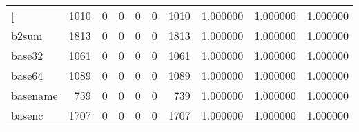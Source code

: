 \begin{longtable}{lrrrrrrrrr}
\bottomrule
\endlastfoot
{[}         &                                               1010 &                                                  0 &                                                  0 &                                                  0 &                                                  0 &                                               1010 &                                           1.000000 &                               1.000000 &                             1.000000 \\
b2sum     &                                               1813 &                                                  0 &                                                  0 &                                                  0 &                                                  0 &                                               1813 &                                           1.000000 &                               1.000000 &                             1.000000 \\
base32    &                                               1061 &                                                  0 &                                                  0 &                                                  0 &                                                  0 &                                               1061 &                                           1.000000 &                               1.000000 &                             1.000000 \\
base64    &                                               1089 &                                                  0 &                                                  0 &                                                  0 &                                                  0 &                                               1089 &                                           1.000000 &                               1.000000 &                             1.000000 \\
basename  &                                                739 &                                                  0 &                                                  0 &                                                  0 &                                                  0 &                                                739 &                                           1.000000 &                               1.000000 &                             1.000000 \\
basenc    &                                               1707 &                                                  0 &                                                  0 &                                                  0 &                                                  0 &                                               1707 &                                           1.000000 &                               1.000000 &                             1.000000 \\

\end{longtable}
